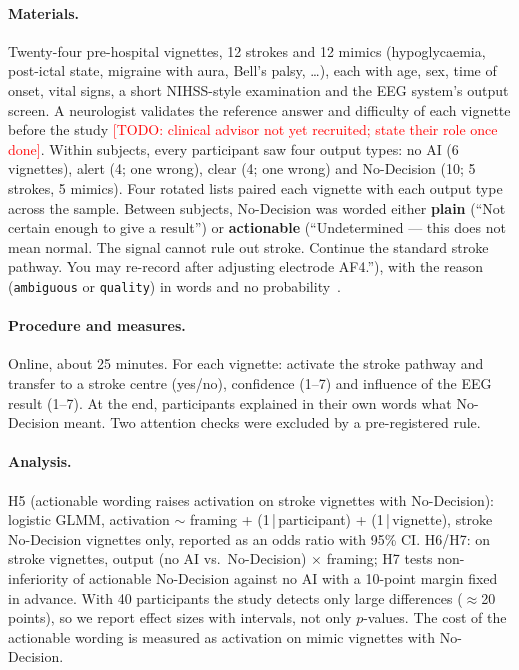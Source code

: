 \documentclass[sigconf,review,anonymous]{acmart}
\newcommand{\TODO}[1]{\textcolor{red}{[TODO: #1]}}
\begin{document}
\paragraph{Materials.}
Twenty-four pre-hospital vignettes, 12 strokes and 12 mimics (hypoglycaemia, post-ictal state, migraine with aura, Bell's palsy, \ldots), each with age, sex, time of onset, vital signs, a short NIHSS-style examination and the EEG system's output screen. A neurologist validates the reference answer and difficulty of each vignette before the study \TODO{clinical advisor not yet recruited; state their role once done}.
Within subjects, every participant saw four output types: no AI (6 vignettes), alert (4; one wrong), clear (4; one wrong) and No-Decision (10; 5 strokes, 5 mimics). Four rotated lists paired each vignette with each output type across the sample.
Between subjects, No-Decision was worded either \textbf{plain} (``Not certain enough to give a result'') or \textbf{actionable} (``Undetermined --- this does not mean normal. The signal cannot rule out stroke. Continue the standard stroke pathway. You may re-record after adjusting electrode AF4.''), with the reason (\texttt{ambiguous} or \texttt{quality}) in words and no probability~\cite{bondi2022}.

\paragraph{Procedure and measures.}
Online, about 25 minutes. For each vignette: activate the stroke pathway and transfer to a stroke centre (yes/no), confidence (1--7) and influence of the EEG result (1--7). At the end, participants explained in their own words what No-Decision meant. Two attention checks were excluded by a pre-registered rule.

\paragraph{Analysis.}
H5 (actionable wording raises activation on stroke vignettes with No-Decision): logistic GLMM, activation $\sim$ framing + (1\,|\,participant) + (1\,|\,vignette), stroke No-Decision vignettes only, reported as an odds ratio with 95\% CI.
H6/H7: on stroke vignettes, output (no AI vs.\ No-Decision) $\times$ framing; H7 tests non-inferiority of actionable No-Decision against no AI with a 10-point margin fixed in advance.
With 40 participants the study detects only large differences ($\approx$20 points), so we report effect sizes with intervals, not only $p$-values.
The cost of the actionable wording is measured as activation on mimic vignettes with No-Decision.
\end{document}
